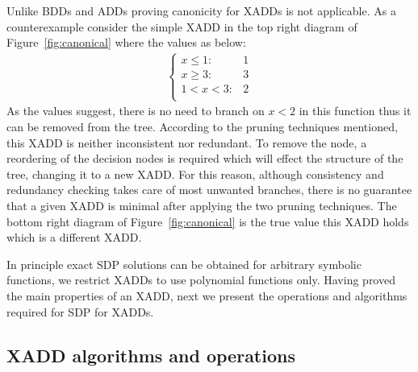 \documentclass[twoside,11pt]{article}
\begin{document}
Unlike BDDs and ADDs proving canonicity for XADDs is not applicable. As a counterexample consider the simple XADD in the top right diagram of Figure~\ref{fig:canonical} where the values as below: 
\begin{align*}
	\begin{cases}
		x \leq 1 :& 1  \\
		x \geq 3 :&3\\
		1<x<3 :& 2\\
	\end{cases}
\end{align*}
As the values suggest, there is no need to branch on $x<2$ in this function thus it can be removed from the tree. According to the pruning techniques mentioned, this XADD is neither inconsistent nor redundant. To remove the node, a reordering of the decision nodes is required which will effect the structure of the tree, changing it to a new XADD. For this reason, although consistency and redundancy checking takes care of most unwanted branches, there is no guarantee that a given XADD is minimal after applying the two pruning techniques. The bottom right diagram of Figure~\ref{fig:canonical} is the true value this XADD holds which is a different XADD.

In principle exact SDP solutions can be obtained for arbitrary symbolic functions, we restrict XADDs to use polynomial functions only. %
Having proved the main properties of an XADD, next we present the operations and algorithms required for SDP for XADDs.

\subsection{XADD algorithms and operations}
\end{document}
